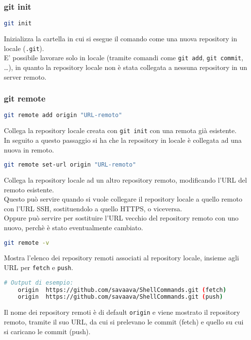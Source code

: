 \subsubsection{git init}
\begin{lstlisting}[language=bash]
	git init
\end{lstlisting}
Inizializza la cartella in cui si esegue il comando come una nuova repository in locale (\texttt{.git}).\\
E' possibile lavorare solo in locale (tramite comandi come \texttt{git add}, \texttt{git commit}, \dots), in quanto la repository locale non è stata collegata a nessuna repository in un server remoto.

\subsubsection{git remote}
\begin{lstlisting}[language=bash]
	git remote add origin "URL-remoto"
\end{lstlisting}
Collega la repository locale creata con \texttt{git init} con una remota già esistente.\\
In seguito a questo passaggio si ha che la repository in locale è collegata ad una nuova in remoto.\\

\begin{lstlisting}[language=bash]
	git remote set-url origin "URL-remoto"
\end{lstlisting}
Collega la repository locale ad un altro repository remoto, modificando l'URL del remoto esistente.\\
Questo può servire quando si vuole collegare il repository locale a quello remoto con l'URL SSH, sostituendolo a quello HTTPS, o viceversa.\\
Oppure può servire per sostituire l'URL vecchio del repository remoto con uno nuovo, perchè è stato eventualmente cambiato.\\

\begin{lstlisting}[language=bash]
	git remote -v
\end{lstlisting}
Mostra l'elenco dei repository remoti associati al repository locale, insieme agli URL per \texttt{fetch} e \texttt{push}.
\begin{lstlisting}[language=bash]
	# Output di esempio:
	origin  https://github.com/savaava/ShellCommands.git (fetch)
	origin  https://github.com/savaava/ShellCommands.git (push)
\end{lstlisting}
Il nome dei repository remoti è di default \texttt{origin} e viene mostrato il repository remoto, tramite il suo URL, da cui si prelevano le commit (fetch) e quello su cui si caricano le commit (push).\\

